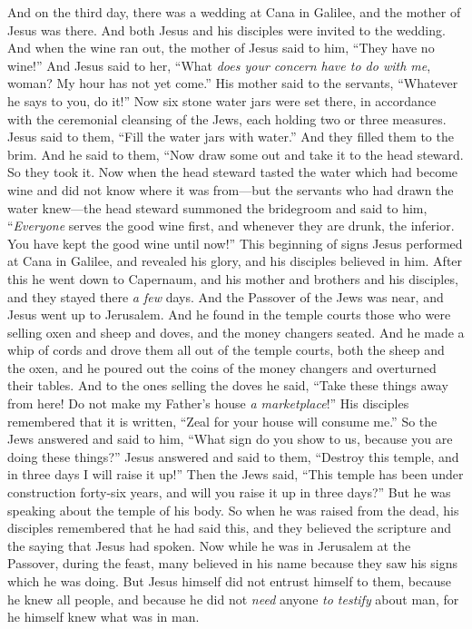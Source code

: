 \begin{biblechapter} %
 And on the third day, there was a wedding at Cana in Galilee, and the mother of Jesus was there.
\verse And both Jesus and his disciples were invited to the wedding.
\verse And when the wine ran out, the mother of Jesus said to him, “They have no wine!”
\verse And Jesus said to her, “What \textit{does your concern have to do with me}, woman? My hour has not yet come.”
\verse His mother said to the servants, “Whatever he says to you, do it!”
\verse Now six stone water jars were set there, in accordance with the ceremonial cleansing of the Jews, each holding two or three measures.
\verse Jesus said to them, “Fill the water jars with water.” And they filled them to the brim.
\verse And he said to them, “Now draw some out and take it to the head steward. So they took it.
\verse Now when the head steward tasted the water which had become wine and did not know where it was from—but the servants who had drawn the water knew—the head steward summoned the bridegroom
\verse and said to him, “\textit{Everyone} serves the good wine first, and whenever they are drunk, the inferior. You have kept the good wine until now!”
\verse This beginning of signs Jesus performed at Cana in Galilee, and revealed his glory, and his disciples believed in him.
 After this he went down to Capernaum, and his mother and brothers and his disciples, and they stayed there \textit{a few} days.
\verse And the Passover of the Jews was near, and Jesus went up to Jerusalem.
 And he found in the temple courts those who were selling oxen and sheep and doves, and the money changers seated.
\verse And he made a whip of cords and drove them all out of the temple courts, both the sheep and the oxen, and he poured out the coins of the money changers and overturned their tables.
\verse And to the ones selling the doves he said, “Take these things away from here! Do not make my Father’s house \textit{a marketplace}!”
\verse His disciples remembered that it is written, “Zeal for your house will consume me.”
\verse So the Jews answered and said to him, “What sign do you show to us, because you are doing these things?”
\verse Jesus answered and said to them, “Destroy this temple, and in three days I will raise it up!”
\verse Then the Jews said, “This temple has been under construction forty-six years, and will you raise it up in three days?”
\verse But he was speaking about the temple of his body.
\verse So when he was raised from the dead, his disciples remembered that he had said this, and they believed the scripture and the saying that Jesus had spoken.
 Now while he was in Jerusalem at the Passover, during the feast, many believed in his name because they saw his signs which he was doing.
\verse But Jesus himself did not entrust himself to them, because he knew all people,
\verse and because he did not \textit{need} anyone \textit{to testify} about man, for he himself knew what was in man.
\end{biblechapter}

